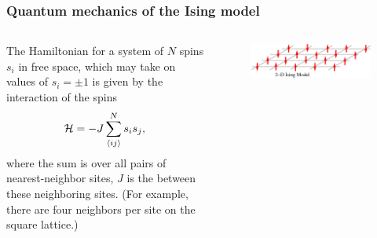 \documentclass[hyperref={colorlinks=true}]{beamer}
\begin{document}
\begin{frame}
\begin{columns}
  \end{columns}

  \pause 
  
  \centering {}

\end{frame}


\begin{frame}%
  \frametitle{Quantum mechanics of the Ising model}

  \begin{columns}
  
  
  The Hamiltonian for a system of $N$ spins $s_i$ in free space, which may take on values of $s_i = \pm1$ is given by the interaction of the spins
  \begin{equation}
    \mathcal{H} = -J \sum_{\langle ij \rangle}^N s_i s_{j} , \label{eq:ising-free}
  \end{equation} 
  where the sum  is over all pairs of nearest-neighbor sites, $J$ is the  between these neighboring sites. (For example, there are four neighbors per site on the square lattice.)
  
  \vspace{-0.5cm}
  
    \begin{figure}
      \centering
      \includegraphics[width=0.8\columnwidth]{Ising-spins-2D.png}
    \end{figure}
    
  

\end{columns}
\end{frame}
\end{document}
